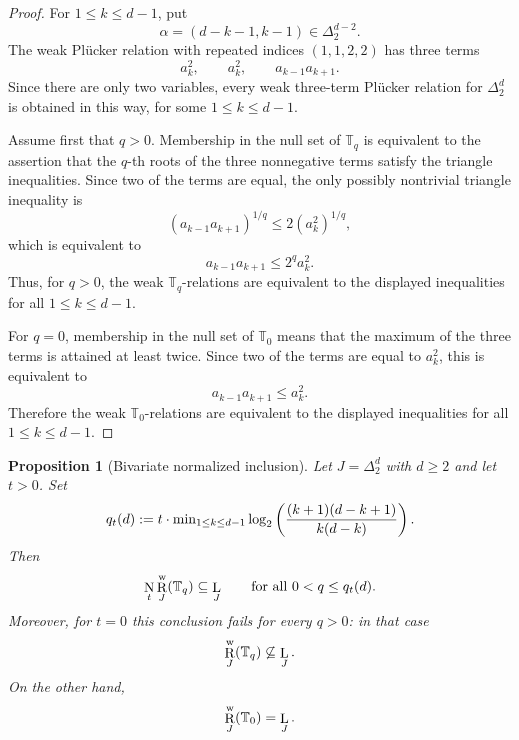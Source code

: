 \documentclass[12pt]{amsart}
\newtheorem{proposition}[theorem]{Proposition}
\theoremstyle{definition}
\newcommand{\1}{\mathbf{1}}
\DeclareMathOperator{\upN}{N}   %
\DeclareMathOperator{\upL}{L}   %
\DeclareMathOperator{\upR}{R}   %
\newcommand\T{{\mathbb T}}
\renewcommand{\min}{\textup{min}}
\renewcommand\geq{\geqslant}
\newcommand\mb{\texorpdfstring{\textbf{Matt:} }{Matt: }}
\newcommand{\mk}[2][]{\todo[color=orange, #1]{\textbf{Mario}: #2}}
\newcommand\ol{\texorpdfstring{\textbf{Oliver:} }{Oliver: }}
\begin{document}
\begin{proof}
For $1\le k\le d-1$, put
\[
        \alpha=(d-k-1,k-1)\in \Delta_2^{d-2}.
\]
The weak Pl\"ucker relation with repeated indices $(1,1,2,2)$ has three
terms
\[
        a_k^2,\qquad a_k^2,\qquad a_{k-1}a_{k+1}.
\]
Since there are only two variables, every weak three-term Pl\"ucker relation
for $\Delta_2^d$ is obtained in this way, for some $1\le k\le d-1$.

Assume first that $q>0$.  Membership in the null set of $\T_q$ is equivalent
to the assertion that the $q$-th roots of the three nonnegative terms satisfy
the triangle inequalities.  Since two of the terms are equal, the only possibly
nontrivial triangle inequality is
\[
        (a_{k-1}a_{k+1})^{1/q}
        \le
        2(a_k^2)^{1/q},
\]
which is equivalent to
\[
        a_{k-1}a_{k+1}\le 2^q a_k^2.
\]
Thus, for $q>0$, the weak $\T_q$-relations are equivalent to the displayed
inequalities for all $1\le k\le d-1$.

For $q=0$, membership in the null set of $\T_0$ means that the maximum of
the three terms is attained at least twice.  Since two of the terms are equal
to $a_k^2$, this is equivalent to
\[
        a_{k-1}a_{k+1}\le a_k^2.
\]
Therefore the weak $\T_0$-relations are equivalent to the displayed
inequalities for all $1\le k\le d-1$.
\end{proof}

\begin{proposition}[Bivariate normalized inclusion]
\label{prop:bivariate-Nt}
Let $J=\Delta_2^d$ with $d \geq 2$ and let $t>0$.  Set
\[
q_t(d):=
t \cdot \min_{1\le k\le d-1}
\log_2\left(\frac{(k+1)(d-k+1)}{k(d-k)}\right).
\]
Then
\[
\upN_t\upR_J^{\rm w}(\T_q)\subseteq \upL_J
\qquad\text{for all }0<q\le q_t(d).
\]
Moreover, for $t=0$ this conclusion fails for every $q>0$:
in that case
\[
\upR_J^{\rm w}(\T_q)\not\subseteq \upL_J.
\]
On the other hand,
\[
\upR_J^{\rm w}(\T_0)=\upL_J.
\]
\end{proposition}

\end{document}
